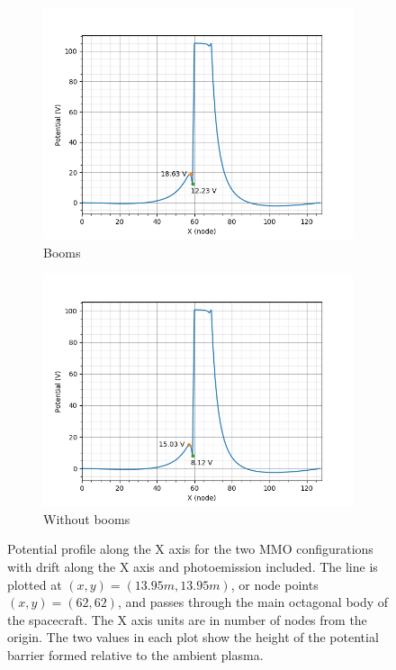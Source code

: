 
\begin{figure}[H]
  \begin{subfigure}[b]{0.6\textwidth}
  \includegraphics[width=\textwidth]{figures/MMO/posX/WB/L_posX_WB.png}
  \caption{Booms}
  \label{fig:L_posX_WB}
\end{subfigure}
\begin{subfigure}[b]{0.6\textwidth}
  \includegraphics[width=\textwidth]{figures/MMO/posX/NB/L_posX_NB.png}
  \caption{Without booms}
  \label{fig:L_posX_NB}
\end{subfigure}
\caption{Potential profile along the X axis for the two MMO configurations with drift along the X axis and photoemission included. The line is plotted at $(x,y) = (13.95 m, 13.95 m)$, or node points $(x,y) = (62,62)$, and passes through the main octagonal body of the spacecraft. The X axis units are in number of nodes from the origin. The two values in each plot show the height of the potential barrier formed relative to the ambient plasma.}
\label{fig:Line_posX}
\end{figure}

